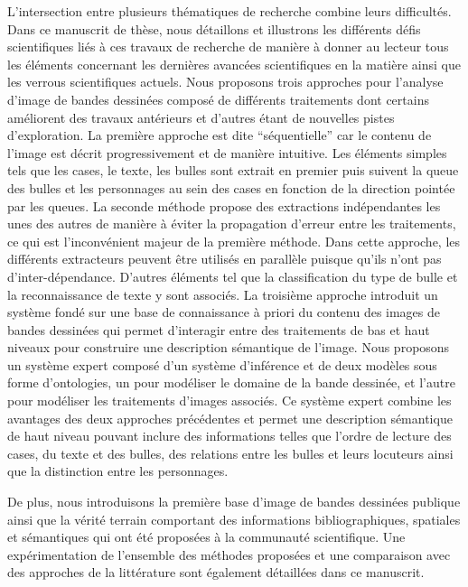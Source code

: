 L'intersection entre plusieurs thématiques de recherche combine leurs difficultés.
Dans ce manuscrit de thèse, nous détaillons et illustrons les différents défis scientifiques liés à ces travaux de recherche de manière à donner au lecteur tous les éléments concernant les dernières avancées scientifiques en la matière ainsi que les verrous scientifiques actuels. 
Nous proposons trois approches pour l'analyse d'image de bandes dessinées composé de différents traitements dont certains améliorent des travaux antérieurs et d'autres étant de nouvelles pistes d'exploration.
La première approche est dite ``séquentielle'' car le contenu de l'image est décrit progressivement et de manière intuitive.
Les éléments simples tels que les cases, le texte, les bulles sont extrait en premier puis suivent la queue des bulles et les personnages au sein des cases en fonction de la direction pointée par les queues.
La seconde méthode propose des extractions indépendantes les unes des autres de manière à éviter la propagation d'erreur entre les traitements, ce qui est l'inconvénient majeur de la première méthode.
Dans cette approche, les différents extracteurs peuvent être utilisés en parallèle puisque qu'ils n'ont pas d'inter-dépendance.
D'autres éléments tel que la classification du type de bulle et la reconnaissance de texte y sont associés.
La troisième approche introduit un système fondé sur une base de connaissance à priori du contenu des images de bandes dessinées qui permet d'interagir entre des traitements de bas et haut niveaux pour construire une description sémantique de l'image.
Nous proposons un système expert composé d'un système d'inférence et de deux modèles sous forme d'ontologies, un pour modéliser le domaine de la bande dessinée, et l'autre pour modéliser les traitements d'images associés.
Ce système expert combine les avantages des deux approches précédentes et permet une description sémantique de haut niveau pouvant inclure des informations telles que l'ordre de lecture des cases, du texte et des bulles, des relations entre les bulles  et leurs locuteurs ainsi que la distinction entre les personnages.

De plus, nous introduisons la première base d'image de bandes dessinées publique ainsi que la vérité terrain comportant des informations bibliographiques, spatiales et sémantiques qui ont été proposées à la communauté scientifique.
Une expérimentation de l'ensemble des méthodes proposées et une comparaison avec des approches de la littérature sont également détaillées dans ce manuscrit.



\clearpage\thispagestyle{empty}